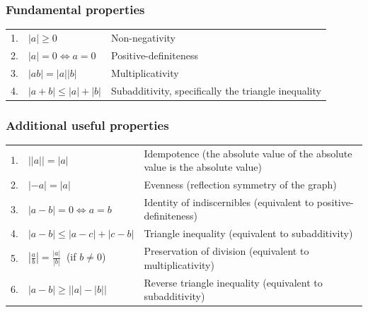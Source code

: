 \subsubsection*{Fundamental properties \cite{basic-maths/online/wiki/Absolute-value}} \label{Basic Functions/Absolute Value function or Modulus Function/Fundamental properties}

\begin{customArrayStretch}{1.2}
\begin{tabular}{r l l}
     1. & ${\displaystyle |a|\geq 0}$ & Non-negativity \\
     
     2. & ${\displaystyle |a|=0\iff a=0}$ & Positive-definiteness \\
     
     3. & ${\displaystyle |ab|=\left|a\right|\left|b\right|}$ & 	Multiplicativity \\
     
     4. & ${\displaystyle |a+b|\leq |a|+|b|}$ & 	Subadditivity, specifically the triangle inequality \\
\end{tabular}
\end{customArrayStretch}

\subsubsection*{Additional useful properties \cite{basic-maths/online/wiki/Absolute-value}} \label{Basic Functions/Absolute Value function or Modulus Function/Additional useful properties}

\begin{customArrayStretch}{1.5}
\begin{tabular}{r l p{13cm}}
     1. & ${\displaystyle {\bigl |}\left|a\right|{\bigr |}=|a|}$ & 	Idempotence (the absolute value of the absolute value is the absolute value) \\
     
     2. & ${\displaystyle \left|-a\right|=|a|}$ & Evenness (reflection symmetry of the graph) \\
     
     3. & ${\displaystyle |a-b|=0\iff a=b}$ & 	Identity of indiscernibles (equivalent to positive-definiteness) \\
     
     4. & ${\displaystyle |a-b|\leq |a-c|+|c-b|}$ & 	Triangle inequality (equivalent to subadditivity) \\
     
     5. & ${\displaystyle \left|{\frac {a}{b}}\right|={\frac {|a|}{|b|}}\ }$ (if ${\displaystyle b\neq 0}$) & 	Preservation of division (equivalent to multiplicativity) \\
     
     6. & ${\displaystyle |a-b|\geq {\bigl |}\left|a\right|-\left|b\right|{\bigr |}}$ & 	Reverse triangle inequality (equivalent to subadditivity) \\
\end{tabular}
\end{customArrayStretch}

